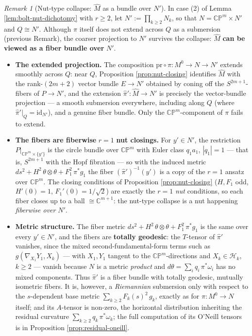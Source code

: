 \documentclass[11pt]{amsart}
\theoremstyle{plain}
\numberwithin{equation}{section}
\theoremstyle{definition}
\theoremstyle{remark}
\newtheorem*{remarkx}{Remark}
\begin{document}
\begin{remarkx}[Nut-type collapse: $\widehat{M}$ as a bundle over $N'$]
	In case (2) of Lemma \ref{lem:bolt-nut-dichotomy} with $r \geq 2$, let $N' := \prod_{k \geq 2} N_k$, so that $N = \mathbb{CP}^m \times N'$ and $Q \cong N'$. Although $\pi$ itself does not extend across $Q$ as a submersion (previous Remark), the coarser projection to $N'$ survives the collapse: $\widehat{M}$ \textbf{can be viewed as a fiber bundle over} $N'$.
	
	\begin{itemize}
		\item \textbf{The extended projection.} The composition $\mathrm{pr} \circ \pi : M^0 \to N \to N'$ extends smoothly across $Q$: near $Q$, Proposition \ref{prop:nut-closing} identifies $\widehat{M}$ with the rank-$(2m+2)$ vector bundle $E \to N'$ obtained by coning off the $S^{2m+1}$-fibers of $P \to N'$, and the extension $\widehat{\pi}' : \widehat{M} \to N'$ is precisely the vector-bundle projection --- a smooth submersion everywhere, including along $Q$ (where $\widehat{\pi}'|_Q = \mathrm{id}_{N'}$), and a genuine fiber bundle. Only the $\mathbb{CP}^m$-component of $\pi$ fails to extend.
		\item \textbf{The fibers are fiberwise }$r = 1$\textbf{ nut closings.} For $y' \in N'$, the restriction $P|_{\mathbb{CP}^m \times \{y'\}}$ is the circle bundle over $\mathbb{CP}^m$ with Euler class $q_1 a_1$, $|q_1| = 1$ --- that is, $S^{2m+1}$ with the Hopf fibration --- so with the induced metric $ds^2 + H^2\, \theta \otimes \theta + F_1^2\, \pi^* g_1$ the fiber $(\widehat{\pi}')^{-1}(y')$ is a copy of the $r = 1$ ansatz over $\mathbb{CP}^m$. The closing conditions of Proposition \ref{prop:nut-closing} ($H, F_1$ odd, $H'(0) = 1$, $F_1'(0) = 1/\sqrt{2}$) are exactly the $r = 1$ \emph{nut} conditions, so each fiber closes up to a ball $\cong \mathbb{C}^{m+1}$: the nut-type collapse is a nut happening \emph{fiberwise over} $N'$.
		\item \textbf{Metric structure.} The fiber metric $ds^2 + H^2\,\theta\otimes\theta + F_1^2\,\pi^*g_1$ is the same over every $y' \in N'$, and the fibers are \textbf{totally geodesic}: the $T$-tensor of $\widehat{\pi}'$ vanishes, since the mixed second-fundamental-form terms such as $g(\nabla_{X_1} Y_1, X_k)$ --- with $X_1, Y_1$ tangent to the $\mathbb{CP}^m$-directions and $X_k \in \mathcal{H}_k$, $k \geq 2$ --- vanish because $N$ is a metric \emph{product} and $d\theta = \sum_i q_i\, \pi^*\omega_i$ has no mixed components. Thus $\widehat{\pi}'$ is a fiber bundle with totally geodesic, mutually isometric fibers. It is, however, a \emph{Riemannian} submersion only with respect to the $s$-dependent base metric $\sum_{k \geq 2} F_k(s)^2\, g_k$, exactly as for $\pi : M^0 \to N$ itself; and its $A$-tensor is non-zero, the horizontal distribution inheriting the residual curvature $\sum_{k \geq 2} q_k\, \pi^*\omega_k$; the full computation of its O'Neill tensors is in Proposition \ref{prop:residual-oneill}.

\end{itemize}
\end{remarkx}
\end{document}
